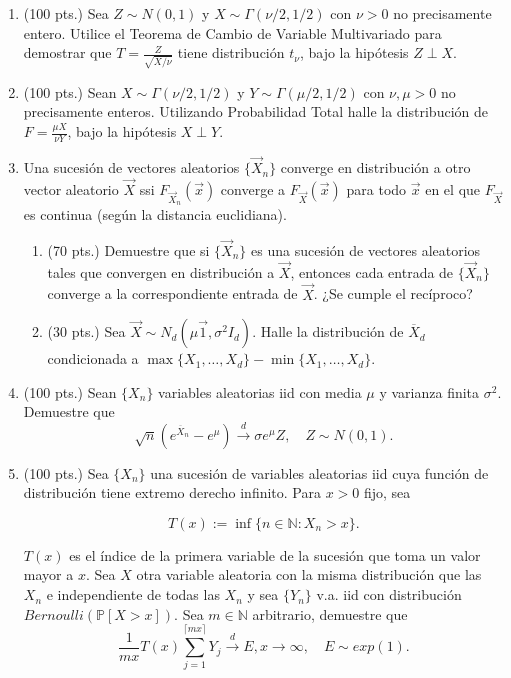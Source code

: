 \documentclass[10pt]{extarticle}
\newcommand{\pai}{\left(}
\newcommand{\pad}{\right)}
\newcommand{\ci}{\left[}
\newcommand{\cd}{\right]}
\newcommand{\nn}{\mathbb{N}}
\newcommand{\p}{\mathbb{P}}
\begin{document}
\begin{enumerate}
\item (100 pts.) Sea $Z\sim N(0,1)$ y $X\sim\Gamma( \nu/2,1/2)$ con $\nu>0$ no precisamente entero. Utilice el Teorema de Cambio de Variable Multivariado para demostrar que $T=\frac{Z}{\sqrt{X/\nu}}$ tiene distribución $t_\nu$, bajo la hipótesis $Z\perp X$.

\item (100 pts.) Sean $X\sim\Gamma( \nu/2,1/2)$ y $Y\sim\Gamma( \mu/2,1/2)$ con $\nu,\mu>0$ no precisamente enteros. Utilizando Probabilidad Total halle la distribución de $F=\frac{\mu X}{\nu Y}$, bajo la hipótesis $X\perp Y$.

\item Una sucesión de vectores aleatorios $\{\vec{X}_n\}$ converge en distribución a otro vector aleatorio $\vec{X}$ ssi $F_{\vec{X}_n}(\vec{x})$ converge a $F_{\vec{X}}(\vec{x})$ para todo $\vec{x}$ en el que $F_{\vec{X}}$ es continua (según la distancia euclidiana).
\begin{enumerate}
\item (70 pts.) Demuestre que si $\{\vec{X}_n\}$ es una sucesión de vectores aleatorios tales que convergen en distribución a $\vec{X}$, entonces cada entrada de $\{\vec{X}_n\}$ converge a la correspondiente entrada de $\vec{X}$. ¿Se cumple el recíproco?

\item (30 pts.) Sea $\vec{X}\sim N_d(\mu \vec{1},\sigma^2 I_d)$. Halle la distribución de $\overline{X}_d$ condicionada a $\max\{X_1,\dots,X_d\}-\min\{X_1,\dots,X_d\}$.
\end{enumerate}

\item (100 pts.) Sean $\{X_n\}$ variables aleatorias iid con media $\mu$ y varianza finita $\sigma^2$. Demuestre que 
$$\sqrt{n}\pai e^{\overline{X}_n}-e^\mu\pad\overset{d}{\to} \sigma e^\mu Z,\quad Z\sim N(0,1).$$
\item (100 pts.) Sea $\{X_n\}$ una sucesión de variables aleatorias iid cuya función de distribución tiene extremo derecho infinito. Para $x>0$ fijo, sea

$$T(x):=\inf\{n\in\nn:X_n>x\}.$$

$T(x)$ es el índice de la primera variable de la sucesión que toma un valor mayor a $x$. Sea $X$ otra variable aleatoria con la misma distribución que las $X_n$ e independiente de todas las $X_n$ y sea $\{Y_n\}$ v.a. iid con distribución $Bernoulli(\p\ci X>x\cd)$. Sea $m\in\nn$ arbitrario, demuestre que 
$$ \frac{1}{mx}T(x)\sum\limits_{j=1}^{\lceil mx\rceil}Y_j\overset{d}{\to} E,x\to\infty,\quad E\sim exp(1).$$


\end{enumerate}
\end{document}
